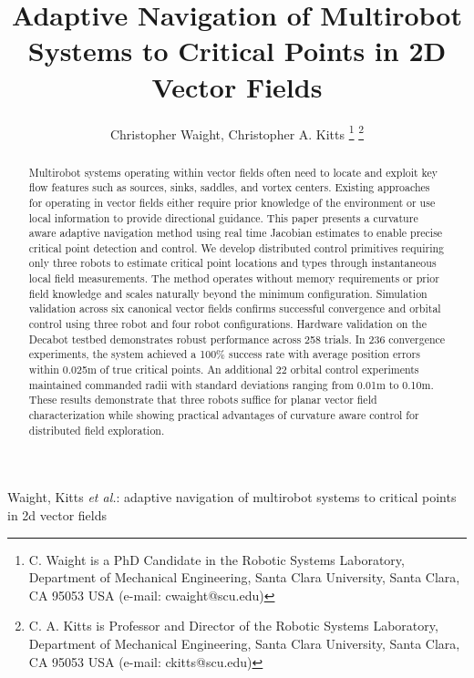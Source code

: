 \documentclass[lettersize,journal]{IEEEtran}
\begin{document}
\title{Adaptive Navigation of Multirobot Systems to Critical Points in 2D Vector Fields}
\author{Christopher Waight, Christopher A. Kitts 
\thanks{C. Waight is a PhD Candidate in the Robotic Systems Laboratory, Department of Mechanical Engineering, Santa Clara University, Santa Clara, CA 95053 USA (e-mail: cwaight@scu.edu)}
\thanks{C. A. Kitts is Professor and Director of the Robotic Systems Laboratory, Department of Mechanical Engineering, Santa Clara University, Santa Clara, CA 95053 USA (e-mail: ckitts@scu.edu)}
}
%
{Waight, Kitts \MakeLowercase{\textit{et al.}: Adaptive Navigation of Multirobot Systems to Critical Points in 2D Vector Fields}}

\maketitle

\begin{abstract}
    Multirobot systems operating within vector fields often need to locate and exploit key flow features such as sources, sinks, saddles, and vortex centers. Existing approaches for operating in vector fields either require prior knowledge of the environment or use local information to provide directional guidance. This paper presents a curvature aware adaptive navigation method using real time Jacobian estimates to enable precise critical point detection and control. We develop distributed control primitives requiring only three robots to estimate critical point locations and types through instantaneous local field measurements. The method operates without memory requirements or prior field knowledge and scales naturally beyond the minimum configuration. Simulation validation across six canonical vector fields confirms successful convergence and orbital control using three robot and four robot configurations. Hardware validation on the Decabot testbed demonstrates robust performance across 258 trials. In 236 convergence experiments, the system achieved a 100\% success rate with average position errors within 0.025m of true critical points. An additional 22 orbital control experiments maintained commanded radii with standard deviations ranging from 0.01m to 0.10m. These results demonstrate that three robots suffice for planar vector field characterization while showing practical advantages of curvature aware control for distributed field exploration.

\end{abstract}
\end{document}
